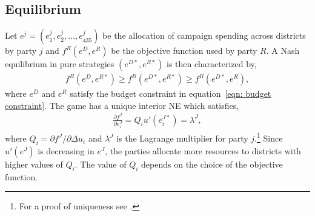 \documentclass[12pt,final,fleqn]{article}
\theoremstyle{plain}
\begin{document}
\subsection{Equilibrium} \label{sec: equilibrium}
Let $e^j = (e_1^j, e_2^j, \ldots, e_{435}^j)$ be the allocation of campaign spending across districts by party $j$ and $f^R(e^D, e^R)$ be the objective function used by party $R$. A Nash equilibrium in pure strategies $(e^{D*}, e^{R*})$ is then characterized by,
\begin{align}
f^R(e^D, e^{R*}) \geq f^R(e^{D*}, e^{R*}) \geq f^R(e^{D*}, e^{R}),
\end{align}
where $e^D$ and $e^R$ satisfy the budget constraint in equation~\ref{eqn: budget constraint}. The game has a unique interior NE which satisfies,
\begin{align}
\frac{\partial f^J}{\partial e_i^J}= Q_i u'(e^{J*}_i)=\lambda^J,
\end{align}
where $Q_i = \partial f^J/ \partial \Delta u_i$ and $\lambda^J$ is the Lagrange multiplier for party $j$.\footnote{For a proof of uniqueness see \citet{stromberg2008electoral}.} Since $u'(e^J)$ is decreasing in $e^J$, the parties allocate more resources to districts with higher values of $Q_i$. The value of $Q_i$ depends on the choice of the objective function.
\end{document}
